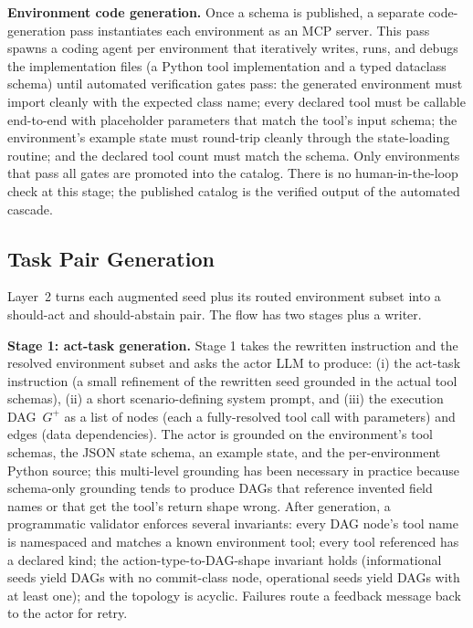 \textbf{Environment code generation.}
Once a schema is published, a separate code-generation pass instantiates each environment as an MCP server. This pass spawns a coding agent per environment that iteratively writes, runs, and debugs the implementation files (a Python tool implementation and a typed dataclass schema) until automated verification gates pass: the generated environment must import cleanly with the expected class name; every declared tool must be callable end-to-end with placeholder parameters that match the tool's input schema; the environment's example state must round-trip cleanly through the state-loading routine; and the declared tool count must match the schema. Only environments that pass all gates are promoted into the catalog. There is no human-in-the-loop check at this stage; the published catalog is the verified output of the automated cascade.

\subsection{Task Pair Generation}
\label{app:task-pair-gen}

Layer~2 turns each augmented seed plus its routed environment subset into a should-act and should-abstain pair. The flow has two stages plus a writer.

\textbf{Stage 1: act-task generation.}
Stage 1 takes the rewritten instruction and the resolved environment subset and asks the actor LLM to produce: (i) the act-task instruction (a small refinement of the rewritten seed grounded in the actual tool schemas), (ii) a short scenario-defining system prompt, and (iii) the execution DAG~$G^+$ as a list of nodes (each a fully-resolved tool call with parameters) and edges (data dependencies). The actor is grounded on the environment's tool schemas, the JSON state schema, an example state, and the per-environment Python source; this multi-level grounding has been necessary in practice because schema-only grounding tends to produce DAGs that reference invented field names or that get the tool's return shape wrong. After generation, a programmatic validator enforces several invariants: every DAG node's tool name is namespaced and matches a known environment tool; every tool referenced has a declared kind; the action-type-to-DAG-shape invariant holds (informational seeds yield DAGs with no commit-class node, operational seeds yield DAGs with at least one); and the topology is acyclic. Failures route a feedback message back to the actor for retry.


